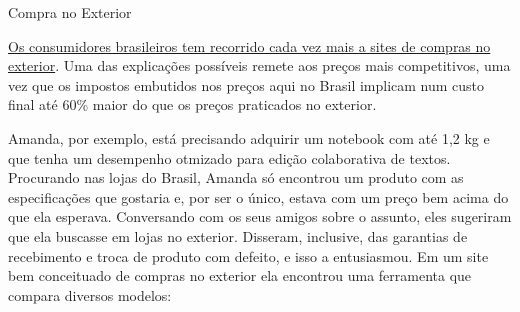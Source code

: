 \begin{task}{Compra no Exterior}

\href{https://www.folhanit.com.br/2018/09/17/brasileiros-gastam-cada-vez-mais-em-sites-de-compras-internacionais/}{Os consumidores brasileiros tem recorrido cada vez mais a sites de compras no exterior}. Uma das explicações possíveis remete aos preços mais competitivos, uma vez que os impostos embutidos nos preços aqui no Brasil implicam num custo final até 60\% maior do que os preços praticados no exterior.

Amanda, por exemplo, está precisando adquirir um notebook com até 1,2 kg e que tenha um desempenho otmizado para edição colaborativa de textos. Procurando nas lojas do Brasil, Amanda só encontrou um produto com as especificações que gostaria e, por ser o único, estava com um preço bem acima do que ela esperava. Conversando com os seus amigos sobre o assunto, eles sugeriram que ela buscasse em lojas no exterior. Disseram, inclusive, das garantias de recebimento e troca de produto com defeito, e isso a entusiasmou. Em um site bem conceituado de compras no exterior ela encontrou uma ferramenta que compara diversos modelos:

\begin{table}[H]
\centering\setlength\tabcolsep{1.5pt}
\renewcommand\arraystretch{1}
\begin{tabular}{|l|l|l|l|l|}
\hline


\end{tabular}
\end{table}
\end{task}
